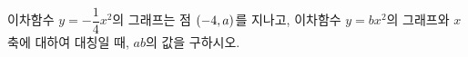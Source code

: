 이차함수 $y=-\dfrac{1}{4}x^2$의 그래프는 점 $(-4{,}\mkern3mu a)$를 지나고, 이차함수 $y=bx^2$의 그래프와 $x$축에 대하여 대칭일 때, $ab$의 값을 구하시오. 
